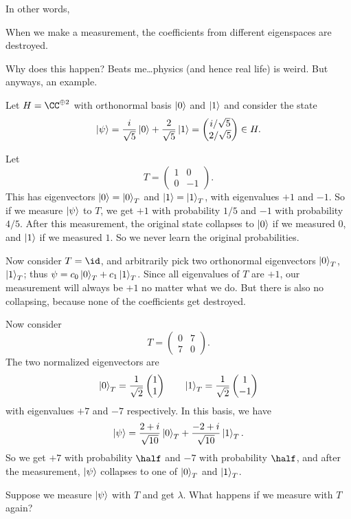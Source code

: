 \documentclass[11pt]{scrreprt}
\begin{document}
In other words,
\begin{moral}
	When we make a measurement,
	the coefficients from different eigenspaces are destroyed.
\end{moral}
Why does this happen? Beats me\dots physics (and hence real life) is weird.
But anyways, an example.
\begin{example}
	Let $H = \CC^{\oplus 2}$ with orthonormal basis $\ket0$ and $\ket1$
	and consider the state
	\[
		\ket\psi
		= \frac{i}{\sqrt5} \ket 0
		+ \frac{2}{\sqrt5} \ket 1
		= \begin{pmatrix} i/\sqrt5 \\ 2/\sqrt5 \end{pmatrix} \in H.
	\]
	\begin{enumerate}[(a)]
		\ii Let \[ T = \begin{pmatrix} 1 & 0 \\ 0 & -1 \end{pmatrix}. \]
		This has eigenvectors $\ket0 = \ket0_T$ and $\ket1 = \ket1_T$,
		with eigenvalues $+1$ and $-1$.  So if we measure $\ket\psi$ to $T$,
		we get $+1$ with probability $1/5$ and $-1$ with probability $4/5$.
		After this measurement, the original state collapses to
		$\ket0$ if we measured $0$, and $\ket1$ if we measured $1$.
		So we never learn the original probabilities.

		\ii Now consider $T = \id$, and arbitrarily
		pick two orthonormal eigenvectors $\ket0_T$, $\ket1_T$;
		thus $\psi = c_0\ket0_T + c_1\ket1_T$.
		Since all eigenvalues of $T$ are $+1$,
		our measurement will always be $+1$ no matter what we do.
		But there is also no collapsing,
		because none of the coefficients get destroyed.

		\ii Now consider
		\[ T = \begin{pmatrix} 0 & 7 \\ 7 & 0 \end{pmatrix}. \]
		The two normalized eigenvectors are
		\[ \ket0_T = \frac{1}{\sqrt2}\begin{pmatrix} 1 \\ 1 \end{pmatrix}
		\qquad \ket1_T = \frac{1}{\sqrt2}\begin{pmatrix} 1 \\ -1 \end{pmatrix} \]
		with eigenvalues $+7$ and $-7$ respectively. In this basis, we have
		\[
			\ket\psi = \frac{2+i}{\sqrt{10}}\ket0_T
			+ \frac{-2+i}{\sqrt{10}}\ket1_T. \]
		So we get $+7$ with probability $\half$ and $-7$
		with probability $\half$, and after the measurement,
		$\ket\psi$ collapses to one of $\ket0_T$ and $\ket1_T$.
	\end{enumerate}
\end{example}
\begin{ques}
	Suppose we measure $\ket\psi$ with $T$ and get $\lambda$.
	What happens if we measure with $T$ again?
\end{ques}
\end{document}
